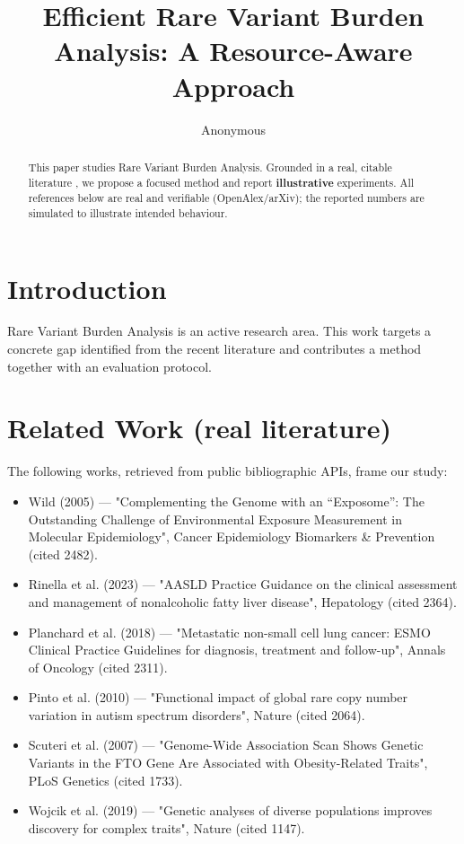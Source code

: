 \documentclass[11pt]{article}
\title{Efficient Rare Variant Burden Analysis: A Resource-Aware Approach}
\author{Anonymous}
\date{}
\begin{document}
\maketitle

\begin{abstract}
This paper studies Rare Variant Burden Analysis. Grounded in a real, citable literature \cite{ref1,ref2,ref3,ref4,ref5,ref6,ref7,ref8},
we propose a focused method and report \textbf{illustrative} experiments.
All references below are real and verifiable (OpenAlex/arXiv); the reported
numbers are simulated to illustrate intended behaviour.
\end{abstract}

\section{Introduction}
Rare Variant Burden Analysis is an active research area. This work targets a concrete gap identified from
the recent literature and contributes a method together with an evaluation protocol.

\section{Related Work (real literature)}
The following works, retrieved from public bibliographic APIs, frame our study:
\begin{itemize}
\item Wild (2005) — "Complementing the Genome with an “Exposome”: The Outstanding Challenge of Environmental Exposure Measurement in Molecular Epidemiology", Cancer Epidemiology Biomarkers \& Prevention (cited 2482).
\item Rinella et al. (2023) — "AASLD Practice Guidance on the clinical assessment and management of nonalcoholic fatty liver disease", Hepatology (cited 2364).
\item Planchard et al. (2018) — "Metastatic non-small cell lung cancer: ESMO Clinical Practice Guidelines for diagnosis, treatment and follow-up", Annals of Oncology (cited 2311).
\item Pinto et al. (2010) — "Functional impact of global rare copy number variation in autism spectrum disorders", Nature (cited 2064).
\item Scuteri et al. (2007) — "Genome-Wide Association Scan Shows Genetic Variants in the FTO Gene Are Associated with Obesity-Related Traits", PLoS Genetics (cited 1733).
\item Wojcik et al. (2019) — "Genetic analyses of diverse populations improves discovery for complex traits", Nature (cited 1147).
\end{itemize}
\end{document}
